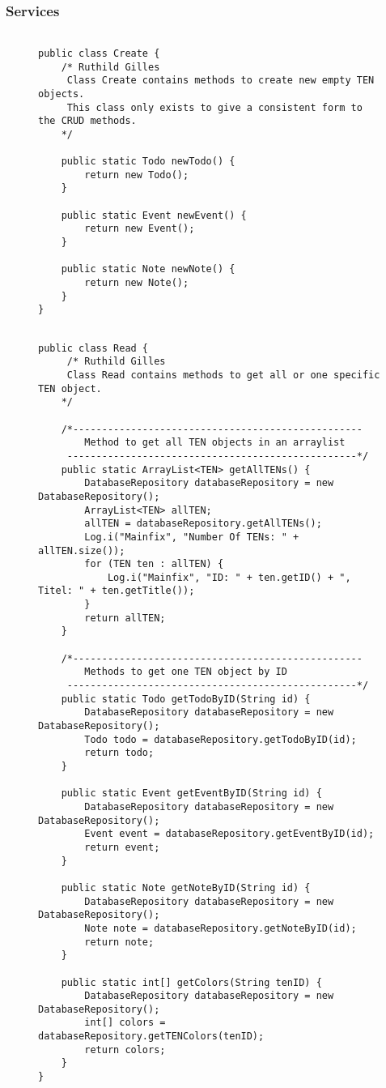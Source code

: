 	\subsubsection{Services}
\begin{figure}[H]
\begin{lstlisting}[caption=Create (Ruthild Gilles)]

public class Create {
    /* Ruthild Gilles
     Class Create contains methods to create new empty TEN objects.
     This class only exists to give a consistent form to the CRUD methods.
    */

    public static Todo newTodo() {
        return new Todo();
    }

    public static Event newEvent() {
        return new Event();
    }

    public static Note newNote() {
        return new Note();
    }
}
\end{lstlisting}
\end{figure}

\begin{figure}[H]
\begin{lstlisting}[caption=Read (Ruthild Gilles)]

public class Read {
     /* Ruthild Gilles
     Class Read contains methods to get all or one specific TEN object.
    */

    /*--------------------------------------------------
        Method to get all TEN objects in an arraylist
     --------------------------------------------------*/
    public static ArrayList<TEN> getAllTENs() {
        DatabaseRepository databaseRepository = new DatabaseRepository();
        ArrayList<TEN> allTEN;
        allTEN = databaseRepository.getAllTENs();
        Log.i("Mainfix", "Number Of TENs: " + allTEN.size());
        for (TEN ten : allTEN) {
            Log.i("Mainfix", "ID: " + ten.getID() + ", Titel: " + ten.getTitle());
        }
        return allTEN;
    }

    /*--------------------------------------------------
        Methods to get one TEN object by ID
     --------------------------------------------------*/
    public static Todo getTodoByID(String id) {
        DatabaseRepository databaseRepository = new DatabaseRepository();
        Todo todo = databaseRepository.getTodoByID(id);
        return todo;
    }

    public static Event getEventByID(String id) {
        DatabaseRepository databaseRepository = new DatabaseRepository();
        Event event = databaseRepository.getEventByID(id);
        return event;
    }

    public static Note getNoteByID(String id) {
        DatabaseRepository databaseRepository = new DatabaseRepository();
        Note note = databaseRepository.getNoteByID(id);
        return note;
    }

    public static int[] getColors(String tenID) {
        DatabaseRepository databaseRepository = new DatabaseRepository();
        int[] colors = databaseRepository.getTENColors(tenID);
        return colors;
    }
}
\end{lstlisting}
\end{figure}

